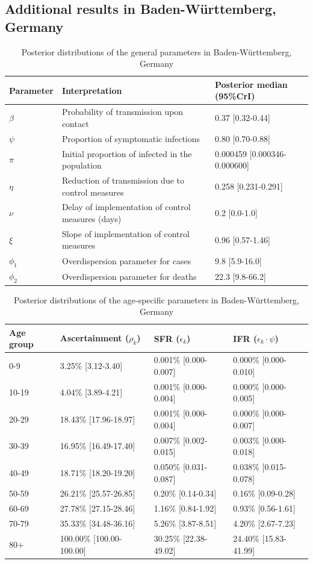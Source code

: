 \documentclass{article}
\begin{document}
\subsection{Additional results in Baden-Württemberg, Germany}
\begin{table}[H]
	\centering
	\begin{tabular}{lll}
		\hline
		Parameter & Interpretation & Posterior median (95\%CrI) \\ 
		\hline
		$\beta$ & Probability of transmission upon contact & 0.37 [0.32-0.44] \\ 
		$\psi$ & Proportion of symptomatic infections & 0.80 [0.70-0.88] \\ 
		$\pi$ & Initial proportion of infected in the population & 0.000459 [0.000346-0.000600] \\ 
		$\eta$ & Reduction of transmission due to control measures & 0.258 [0.231-0.291] \\ 
		$\nu$ & Delay of implementation of control measures (days) & 0.2 [0.0-1.0] \\ 
		$\xi$ & Slope of implementation of control measures & 0.96 [0.57-1.46] \\ 
		$\phi_1$ & Overdispersion parameter for cases & 9.8 [5.9-16.0] \\ 
		$\phi_2$ & Overdispersion parameter for deaths & 22.3 [9.8-66.2] \\ 
		\hline
	\end{tabular}
	\caption{Posterior distributions of the general parameters in Baden-Württemberg, Germany} 
\end{table}
\begin{table}[H]
	\centering
	\begin{tabular}{llll}
		\hline
		Age group & Ascertainment ($\rho_k$) & SFR ($\epsilon_k$) & IFR ($\epsilon_k\cdot\psi$) \\ 
		\hline
		0-9 & 3.25\% [3.12-3.40] & 0.001\% [0.000-0.007] & 0.000\% [0.000-0.010] \\ 
		10-19 & 4.04\% [3.89-4.21] & 0.001\% [0.000-0.004] & 0.000\% [0.000-0.005] \\ 
		20-29 & 18.43\% [17.96-18.97] & 0.001\% [0.000-0.004] & 0.000\% [0.000-0.007] \\ 
		30-39 & 16.95\% [16.49-17.40] & 0.007\% [0.002-0.015] & 0.003\% [0.000-0.018] \\ 
		40-49 & 18.71\% [18.20-19.20] & 0.050\% [0.031-0.087] & 0.038\% [0.015-0.078] \\ 
		50-59 & 26.21\% [25.57-26.85] & 0.20\% [0.14-0.34] & 0.16\% [0.09-0.28] \\ 
		60-69 & 27.78\% [27.15-28.46] & 1.16\% [0.84-1.92] & 0.93\% [0.56-1.61] \\ 
		70-79 & 35.33\% [34.48-36.16] & 5.26\% [3.87-8.51] & 4.20\% [2.67-7.23] \\ 
		80+ & 100.00\% [100.00-100.00] & 30.25\% [22.38-49.02] & 24.40\% [15.83-41.99] \\ 
		\hline
	\end{tabular}
	\caption{Posterior distributions of the age-specific parameters in Baden-Württemberg, Germany} 
\end{table}
\clearpage
\end{document}
